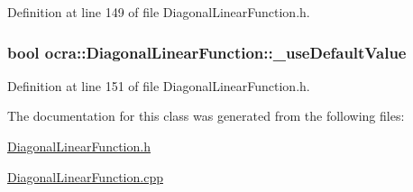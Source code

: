 Definition at line 149 of file Diagonal\+Linear\+Function.\+h.

\subsubsection[{\texorpdfstring{\+\_\+use\+Default\+Value}{_useDefaultValue}}]{\setlength{\rightskip}{0pt plus 5cm}bool ocra\+::\+Diagonal\+Linear\+Function\+::\+\_\+use\+Default\+Value\hspace{0.3cm}{\ttfamily [protected]}}\hypertarget{classocra_1_1DiagonalLinearFunction_a27e25618f0812c42967b363ad3f77fd6}{}\label{classocra_1_1DiagonalLinearFunction_a27e25618f0812c42967b363ad3f77fd6}


Definition at line 151 of file Diagonal\+Linear\+Function.\+h.



The documentation for this class was generated from the following files\+:\begin{DoxyCompactItemize}
\item 
\hyperlink{DiagonalLinearFunction_8h}{Diagonal\+Linear\+Function.\+h}\item 
\hyperlink{DiagonalLinearFunction_8cpp}{Diagonal\+Linear\+Function.\+cpp}\end{DoxyCompactItemize}
